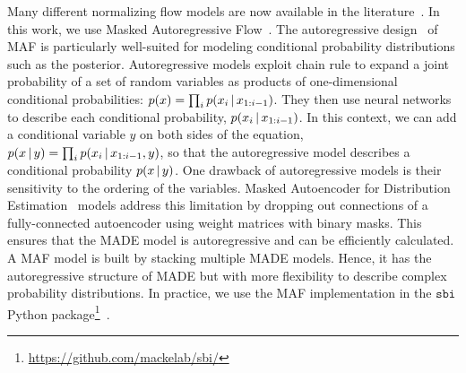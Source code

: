 Many different normalizing flow models are now available in the
literature~\citep[\emph{e.g.}][]{germain2015, durkan2019}.
In this work, we use Masked Autoregressive
Flow~\citep[MAF;][]{papamakarios2017}. 
The autoregressive design~\citep{uria2016} of MAF is particularly well-suited
for modeling conditional probability distributions such as the posterior. 
Autoregressive models exploit chain rule to expand a joint probability of a set
of random variables as products of one-dimensional conditional
probabilities: $p(x) = \prod_i p(x_i\,|\, x_{1:i-1})$. 
They then use neural networks to describe each conditional probability,
$p(x_i\,|\, x_{1:i-1})$. 
In this context, we can add a conditional variable $y$ on both sides of the
equation, $p(x\,|\, y) = \prod_i p(x_i\,|\, x_{1:i-1}, y)$, so that the
autoregressive model describes a conditional probability $p(x\,|\, y)$. 
One drawback of autoregressive models is their sensitivity to the ordering of
the variables. 
Masked Autoencoder for Distribution Estimation~\citep[MADE;][]{germain2015}
models address this limitation by dropping out connections of a
fully-connected autoencoder using weight matrices with binary masks. 
This ensures that the MADE model is autoregressive and can be efficiently
calculated. 
A MAF model is built by stacking multiple MADE models.  
Hence, it has the autoregressive structure of MADE but with more flexibility to
describe complex probability distributions.  
In practice, we use the MAF implementation in the $\mathtt{sbi}$ Python
package\footnote{\url{https://github.com/mackelab/sbi/}}~\citep{greenberg2019,
tejero-cantero2020}.
